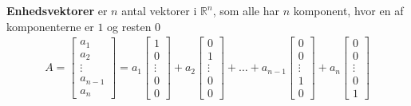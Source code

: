 \begin{defn}[Enhedsvektorer]
\textbf{Enhedsvektorer} er $n$ antal vektorer i $\mathds{R}^n$, som alle har $n$ komponent, hvor en af komponenterne er $1$ og resten $0$
\begin{align*}
A=
\begin{bmatrix}
a_1\\
a_2\\
\vdots\\
a_{n-1}\\
a_n
\end{bmatrix}=
a_1
\begin{bmatrix}
1\\
0\\
\vdots\\
0\\
0
\end{bmatrix}
+
a_2
\begin{bmatrix}
0\\
1\\
\vdots\\
0\\
0
\end{bmatrix}
+
\dots
+a_{n-1}
\begin{bmatrix}
0\\
0\\
\vdots\\
1\\
0
\end{bmatrix}
+
a_n
\begin{bmatrix}
0\\
0\\
\vdots\\
0\\
1
\end{bmatrix}
\end{align*}
\end{defn}